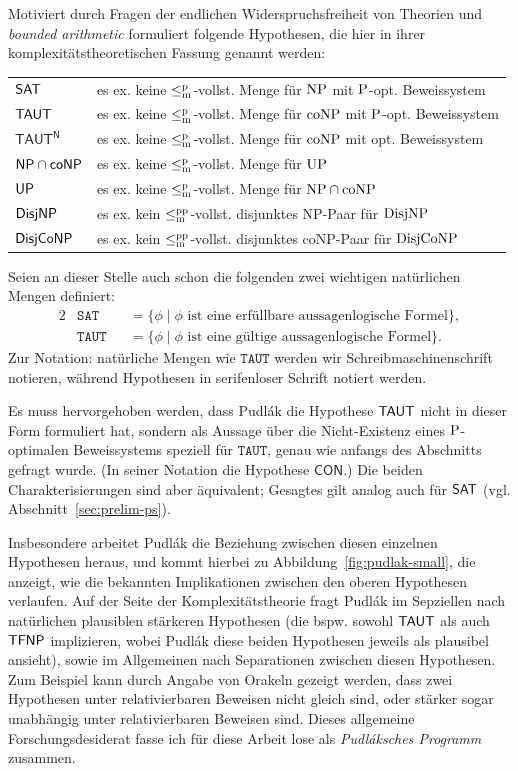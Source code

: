 Motiviert durch Fragen der endlichen Widerspruchsfreiheit von Theorien und \emph{bounded arithmetic} formuliert \textcite{pudlak_incompleteness_2017} folgende Hypothesen, die hier in ihrer komplexitätstheoretischen Fassung genannt werden:\par
\medskip
\begin{tabular}{l@{\quad:\quad}l}
    $\hSAT$ & es ex. keine $\leqmp$-vollst. Menge für $\NP$ mit $\P$-opt. Beweissystem\\
    $\hTAUT$ & es ex. keine $\leqmp$-vollst. Menge für $\coNP$ mit $\P$-opt. Beweissystem\\
    $\mathsf{TAUT^N}$ & es ex. keine $\leqmp$-vollst. Menge für $\coNP$ mit opt. Beweissystem\\
    $\hNPcoNP$ & es ex. keine $\leqmp$-vollst. Menge für $\UP$\\
    $\hUP$ & es ex. keine $\leqmp$-vollst. Menge für $\NP\cap\coNP$\\
    $\hDisjNP$ & es ex. kein $\leqmpp$-vollst. disjunktes NP-Paar für $\DisjNP$\\
    $\hDisjCoNP$ & es ex. kein $\leqmpp$-vollst. disjunktes coNP-Paar für $\DisjCoNP$
\end{tabular}\par
\medskip\noindent
Seien an dieser Stelle auch schon die folgenden zwei wichtigen natürlichen Mengen definiert:
\begin{alignat*}{2}
    &\mathtt{SAT} &&= \{ \phi \mid \text{$\phi$ ist eine erfüllbare aussagenlogische Formel} \},\\
    &\mathtt{TAUT} &&= \{ \phi \mid \text{$\phi$ ist eine gültige aussagenlogische Formel} \}.
\end{alignat*}
Zur Notation: natürliche Mengen wie $\mathtt{TAUT}$ werden wir Schreibmaschinenschrift notieren, während Hypothesen in serifenloser Schrift notiert werden.

Es muss hervorgehoben werden, dass Pudlák die Hypothese $\hTAUT$ nicht in dieser Form formuliert hat, sondern als Aussage über die Nicht-Existenz eines $\P$-optimalen Beweissystems speziell für $\mathtt{TAUT}$, genau wie anfangs des Abschnitts gefragt wurde. (In seiner Notation die Hypothese $\mathsf{CON}$.) Die beiden Charakterisierungen sind aber äquivalent; Gesagtes gilt analog auch für $\hSAT$ (vgl. Abschnitt~\ref{sec:prelim-ps}).


Insbesondere arbeitet Pudlák die Beziehung zwischen diesen einzelnen Hypothesen heraus, und kommt hierbei zu Abbildung~\ref{fig:pudlak-small}, die anzeigt, wie die bekannten Implikationen zwischen den oberen Hypothesen verlaufen.
Auf der Seite der Komplexitätstheorie fragt Pudlák im Sepziellen nach natürlichen plausiblen stärkeren Hypothesen (die bspw. sowohl $\hTAUT$ als auch $\hTFNP$ implizieren, wobei Pudlák diese beiden Hypothesen jeweils als plausibel ansieht), sowie im Allgemeinen nach Separationen zwischen diesen Hypothesen. Zum Beispiel kann durch Angabe von Orakeln gezeigt werden, dass zwei Hypothesen unter relativierbaren Beweisen nicht gleich sind, oder stärker sogar unabhängig unter relativierbaren Beweisen sind. 
Dieses allgemeine Forschungsdesiderat fasse ich für diese Arbeit lose als \emph{Pudláksches Programm} zusammen.

